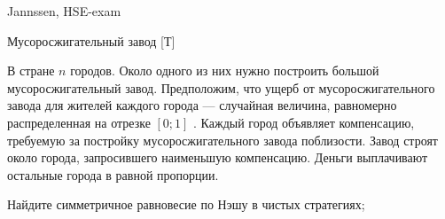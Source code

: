\begin{source}
Jannssen, HSE-exam
\end{source}



\begin{problem}
 Мусоросжигательный завод [Т]\par
В стране  $n$  городов. Около одного из них нужно построить большой мусоросжигательный завод. Предположим, что ущерб от мусоросжигательного завода для жителей каждого города — случайная величина, равномерно распределенная на отрезке  $\left[0;1\right]$ . Каждый город объявляет компенсацию, требуемую за постройку мусоросжигательного завода поблизости. Завод строят около города, запросившего наименьшую компенсацию. Деньги выплачивают остальные города в равной пропорции.\par
Найдите симметричное равновесие по Нэшу в чистых стратегиях;



\begin{sol}

\end{sol}
\end{problem}




